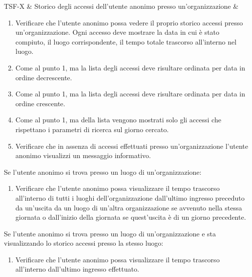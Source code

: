 TSF-X & Storico degli accessi dell'utente anonimo presso un'organizzazione & \begin{enumerate}
    \item Verificare che l'utente anonimo possa vedere il proprio storico accessi presso un'organizzazione. Ogni accesso deve mostrare la data in cui è stato compiuto, il luogo corrispondente, il tempo totale trascorso all'interno nel luogo.
    \item Come al punto 1, ma la lista degli accessi deve risultare ordinata per data in ordine decrescente.
    \item Come al punto 1, ma la lista degli accessi deve risultare ordinata per data in ordine crescente.
    \item Come al punto 1, ma della lista vengono mostrati solo gli accessi che rispettano i parametri di ricerca sul giorno cercato.
    \item Verificare che in assenza di accessi effettuati presso un'organizzazione l'utente anonimo visualizzi un messaggio informativo.
\end{enumerate}
Se l'utente anonimo si trova presso un luogo di un'organizzazione:
\begin{enumerate}
    \item Verificare che l'utente anonimo possa visualizzare il tempo trascorso all'interno di tutti i luoghi dell'organizzazione dall'ultimo ingresso preceduto da un'uscita da un luogo di un'altra organizzazione se avvenuto nella stessa giornata o dall'inizio della giornata se quest'uscita è di un giorno precedente. %
\end{enumerate}
Se l'utente anonimo si trova presso un luogo di un'organizzazione e sta visualizzando lo storico accessi presso la stesso luogo:
\begin{enumerate}
    \item Verificare che l'utente anonimo possa visualizzare il tempo trascorso all'interno dall'ultimo ingresso effettuato.
\end{enumerate} \\

